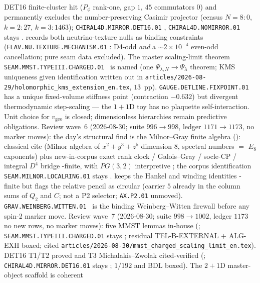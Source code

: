 \documentclass[11pt,a4paper]{article}
\begin{document}
\begin{keybox}
DET16 finite-cluster hit ($P_\phi$ rank-one, gap $1$, $45$ commutators $0$) and permanently
excludes the number-preserving Casimir projector (census $N{=}8{:}0$, $k{=}2{:}27$,
$k{=}3{:}1463$); \texttt{CHIRAL4D.MIRROR.DET16.01} \mC, \texttt{CHIRAL4D.NOMIRROR.01} stays \mO.
 records both
neutrino-texture nulls as binding constraints (\texttt{FLAV.NU.TEXTURE.MECHANISM.01} \mO:
D4-odd \emph{and} a $\sim2{\times}10^{-4}$ even-odd cancellation; pure seam data excluded).
The master scaling-limit theorem \texttt{SEAM.MMST.TYPEIII.CHARGED.01} \mO\ is named (one
$\Psi_{\lambda,N}\to\Psi_\lambda$ theorem; KMS uniqueness given identification written out in
\texttt{articles/2026-08-29/holomorphic\_kms\_extension\_en.tex}, $13$~pp).
\texttt{GAUGE.DETLINE.FIXPOINT.01} has a unique fixed-volume stiffness point (contraction
$-0.632$) but divergent thermodynamic step-scaling --- the $1{+}1$D toy has no plaquette
self-interaction.  Unit choice for $v_{\mathrm{geo}}$ is closed; dimensionless hierarchies
remain predictive obligations.
Review wave~6 (2026-08-30; suite $996\to998$, ledger $1171\to1173$, no marker moves):
the day's structural find is the Milnor--Gray finite algebra
():
classical cite (Milnor algebra of $x^2+y^3+z^5$ dimension $8$, spectral numbers $=$ $E_8$
exponents) plus new-in-corpus exact rank clock / Galois--Gray / socle-CP / integral $D^4$
bridge \mE-finite, with $PG(3,2)$ interpretive \mC; the corpus identification
\texttt{SEAM.MILNOR.LOCALRING.01} stays \mO.
 keeps the
Hankel and winding identities \mE-finite but flags the relative pencil as circular
(carrier $5$ already in the column sums of $Q_2$ and $C$; not a P2 selector;
\texttt{AX.P2.01} unmoved).
\texttt{GRAV.WEINBERG.WITTEN.01} \mO\ is the binding Weinberg--Witten firewall before any
spin-2 marker move.
Review wave~7 (2026-08-30; suite $998\to1002$, ledger $1173$ no new rows, no marker moves):
five MMST lemmas in-house
(;
\texttt{SEAM.MMST.TYPEIII.CHARGED.01} stays \mO; residual TEL-B-EXTERNAL $+$ ALG-EXH boxed;
cited \texttt{articles/2026-08-30/mmst\_charged\_scaling\_limit\_en.tex}).
DET16 T1/T2 proved and T3 Michalakis--Zwolak cited-verified
(;
\texttt{CHIRAL4D.MIRROR.DET16.01} stays \mC; $1/192$ and BDL boxed).
The $2{+}1$D master-object scaffold is coherent

\end{keybox}
\end{document}
